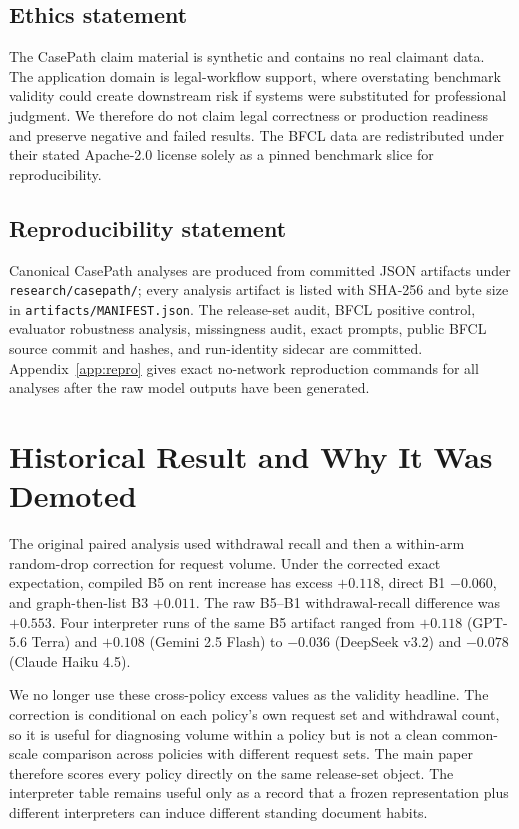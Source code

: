 \documentclass{article}
\begin{document}
\subsection*{Ethics statement}
The CasePath claim material is synthetic and contains no real claimant data. The application domain is legal-workflow support, where overstating benchmark validity could create downstream risk if systems were substituted for professional judgment. We therefore do not claim legal correctness or production readiness and preserve negative and failed results. The BFCL data are redistributed under their stated Apache-2.0 license solely as a pinned benchmark slice for reproducibility.

\subsection*{Reproducibility statement}
Canonical CasePath analyses are produced from committed JSON artifacts under \texttt{research/casepath/}; every analysis artifact is listed with SHA-256 and byte size in \texttt{artifacts/MANIFEST.json}. The release-set audit, BFCL positive control, evaluator robustness analysis, missingness audit, exact prompts, public BFCL source commit and hashes, and run-identity sidecar are committed. Appendix~\ref{app:repro} gives exact no-network reproduction commands for all analyses after the raw model outputs have been generated.




\appendix
\section{Historical Result and Why It Was Demoted}
\label{app:history}
The original paired analysis used withdrawal recall and then a within-arm random-drop correction for request volume. Under the corrected exact expectation, compiled B5 on rent increase has excess $+0.118$, direct B1 $-0.060$, and graph-then-list B3 $+0.011$. The raw B5--B1 withdrawal-recall difference was $+0.553$. Four interpreter runs of the same B5 artifact ranged from $+0.118$ (GPT-5.6 Terra) and $+0.108$ (Gemini 2.5 Flash) to $-0.036$ (DeepSeek v3.2) and $-0.078$ (Claude Haiku 4.5).

We no longer use these cross-policy excess values as the validity headline. The correction is conditional on each policy's own request set and withdrawal count, so it is useful for diagnosing volume within a policy but is not a clean common-scale comparison across policies with different request sets. The main paper therefore scores every policy directly on the same release-set object. The interpreter table remains useful only as a record that a frozen representation plus different interpreters can induce different standing document habits.
\end{document}
